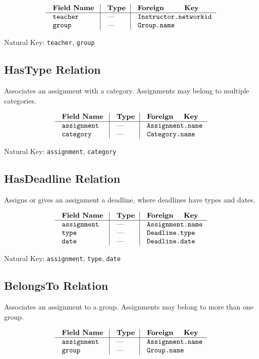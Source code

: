 $$\vbox{
  \offinterlineskip
  \halign{
    \strut \quad {\tt #}  & \vrule\quad #  & \vrule\quad # \cr
    {\bf Field Name}  & {\bf Type}  & {\bf Foreign Key}\cr
    \noalign{\hrule}    
    teacher  & ---  & {\tt Instructor.networkid} \cr
    group  & ---  & {\tt Group.name} \cr
  }
}$$

{\noindent
Natural Key: {\tt teacher}, {\tt group}\par}

\subsection{HasType Relation}
Associates an assignment with a category. 
Assignments may belong to multiple categories.

$$\vbox{
  \offinterlineskip
  \halign{
    \strut \quad {\tt #}  & \vrule\quad #  & \vrule\quad # \cr
    {\bf Field Name}  & {\bf Type}  & {\bf Foreign Key}\cr
    \noalign{\hrule}    
    assignment  & ---  & {\tt Assignment.name} \cr
    category  & ---  & {\tt Category.name} \cr
  }
}$$

{\noindent
Natural Key: {\tt assignment}, {\tt category}\par}

\subsection{HasDeadline Relation}
Assigns or gives an assignment a deadline,
where deadlines have types and dates.

$$\vbox{
  \offinterlineskip
  \halign{
    \strut \quad {\tt #}  & \vrule\quad #  & \vrule\quad # \cr
    {\bf Field Name}  & {\bf Type}  & {\bf Foreign Key}\cr
    \noalign{\hrule}    
    assignment  & ---  & {\tt Assignment.name} \cr
    type  & ---  & {\tt Deadline.type} \cr
    date  & ---  & {\tt Deadline.date} \cr
  }
}$$

{\noindent
Natural Key: {\tt assignment}, {\tt type}, {\tt date}\par}

\subsection{BelongsTo Relation}
Associates an assignment to a group.
Assignments may belong to more than one group.

$$\vbox{
  \offinterlineskip
  \halign{
    \strut \quad {\tt #}  & \vrule\quad #  & \vrule\quad # \cr
    {\bf Field Name}  & {\bf Type}  & {\bf Foreign Key}\cr
    \noalign{\hrule}    
    assignment  & ---  & {\tt Assignment.name} \cr
    group  & ---  & {\tt Group.name} \cr
  }
}$$

